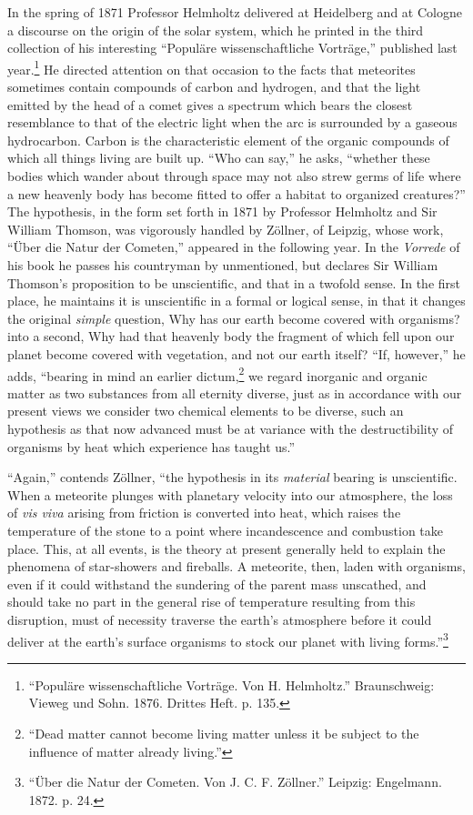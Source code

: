 \documentclass[a4paper, 11pt, oneside, english]{article}
\begin{document}
In the spring of 1871 Professor Helmholtz delivered at Heidelberg and at Cologne a discourse on the origin of the solar system, which he printed in the third collection of his interesting ``Populäre wissenschaftliche Vorträge,'' published last year.\footnote{``Populäre wissenschaftliche Vorträge. Von H. Helmholtz.'' Braunschweig: Vieweg und Sohn. 1876. Drittes Heft. p. 135.} He directed attention on that occasion to the facts that meteorites sometimes contain compounds of carbon and hydrogen, and that the light emitted by the head of a comet gives a spectrum which bears the closest resemblance to that of the electric light when the arc is surrounded by a gaseous hydrocarbon. Carbon is the characteristic element of the organic compounds of which all things living are built up. ``Who can say,'' he asks, ``whether these bodies which wander about through space may not also strew germs of life where a new heavenly body has become fitted to offer a habitat to organized creatures?'' The hypothesis, in the form set forth in 1871 by Professor Helmholtz and Sir William Thomson, was vigorously handled by Zöllner, of Leipzig, whose work, ``Über die Natur der Cometen,'' appeared in the following year. In the \emph{Vorrede} of his book he passes his countryman by unmentioned, but declares Sir William Thomson's proposition to be unscientific, and that in a twofold sense. In the first place, he maintains it is unscientific in a formal or logical sense, in that it changes the original \emph{simple} question, Why has our earth become covered with organisms? into a second, Why had that heavenly body the fragment of which fell upon our planet become covered with vegetation, and not our earth itself? ``If, however,'' he adds, ``bearing in mind an earlier dictum,\footnote{``Dead matter cannot become living matter unless it be subject to the influence of matter already living.''} we regard inorganic and organic matter as two substances from all eternity diverse, just as in accordance with our present views we consider two chemical elements to be diverse, such an hypothesis as that now advanced must be at variance with the destructibility of organisms by heat which experience has taught us.''

``Again,'' contends Zöllner, ``the hypothesis in its \emph{material} bearing is unscientific. When a meteorite plunges with planetary velocity into our atmosphere, the loss of \emph{vis viva} arising from friction is converted into heat, which raises the temperature of the stone to a point where incandescence and combustion take place. This, at all events, is the theory at present generally held to explain the phenomena of star-showers and fireballs. A meteorite, then, laden with organisms, even if it could withstand the sundering of the parent mass unscathed, and should take no part in the general rise of temperature resulting from this disruption, must of necessity traverse the earth's atmosphere before it could deliver at the earth's surface organisms to stock our planet with living forms.''\footnote{``Über die Natur der Cometen. Von J. C. F. Zöllner.'' Leipzig: Engelmann. 1872. p. 24.}
\end{document}
